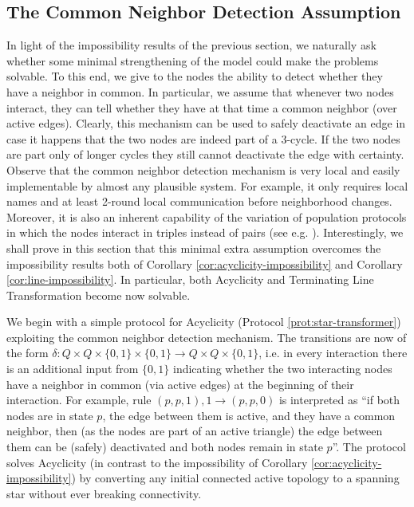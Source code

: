 \documentclass[preprint]{elsarticle}
\newcommand{\ra}{\rightarrow}
\begin{document}
\subsection{The Common Neighbor Detection Assumption}
\label{subsec:neighbor-detection}

In light of the impossibility results of the previous section, we naturally ask whether some minimal strengthening of the model could make the problems solvable. To this end, we give to the nodes the ability to detect whether they have a neighbor in common. In particular, we assume that whenever two nodes interact, they can tell whether they have at that time a common neighbor (over active edges).
Clearly, this mechanism can be used to safely deactivate an edge in case it happens
that the two nodes are indeed part of a 3-cycle. If the two nodes are part
only of longer cycles they still cannot deactivate the edge with
certainty. Observe that the common neighbor detection mechanism is very local and easily implementable by almost any plausible system. For example, it only requires local names and at least 2-round local communication before neighborhood changes. Moreover, it is also an inherent capability of the
variation of population protocols in which the nodes interact in triples instead of pairs (see e.g. \cite{AADFP06,BBRR12}). Interestingly, we shall prove in this section that this minimal extra assumption overcomes the impossibility results both of Corollary \ref{cor:acyclicity-impossibility} and Corollary \ref{cor:line-impossibility}. In particular, both Acyclicity and Terminating Line Transformation become now solvable.

We begin with a simple protocol for Acyclicity (Protocol \ref{prot:star-transformer}) exploiting the common neighbor detection mechanism. The transitions are now of the form $\delta : Q\times Q\times \{0,1\}\times \{0,1\} \rightarrow Q\times Q\times \{0,1\}$, i.e. in every interaction there is an additional input from $\{0,1\}$ indicating whether the two interacting nodes have a neighbor in common (via active edges) at the beginning of their interaction. For example, rule $(p,p,1),1\ra (p,p,0)$ is interpreted as ``if both nodes are in state $p$, the edge between them is active, and they have a common neighbor, then (as the nodes are part of an active triangle) the edge between them can be (safely) deactivated and both nodes remain in state $p$''. The protocol solves Acyclicity (in contrast to the impossibility of Corollary \ref{cor:acyclicity-impossibility}) by converting any initial connected active topology to a spanning star without ever breaking connectivity.
\end{document}
